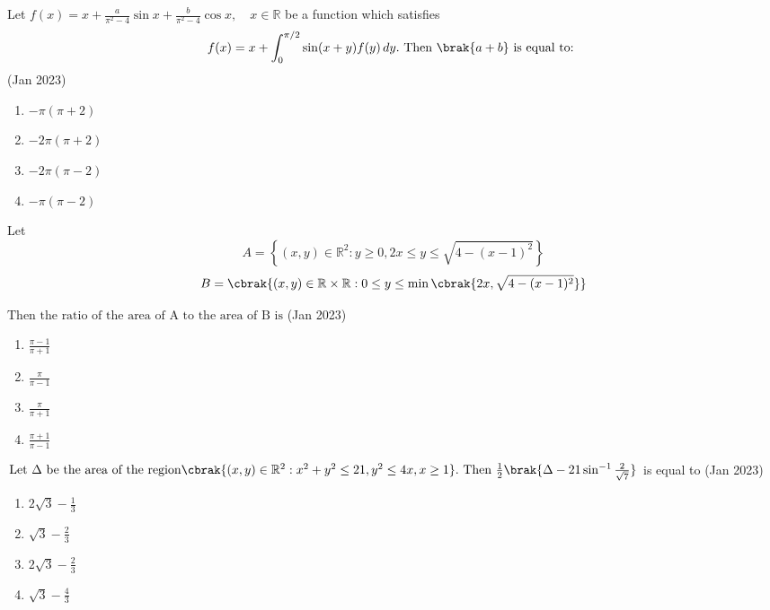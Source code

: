 \item 
Let 
$ f(x) = x + \frac{a}{\pi^2 - 4} \sin x + \frac{b}{\pi^2 - 4} \cos x, \quad x \in \mathbb{R} $ 
be a function which satisfies 
\begin{align*} 
f(x) = x + \int_0^{\pi/2} \sin(x + y) f(y) \, dy.  
\text{ Then }  \brak{a + b} \text{ is equal to: }
\end{align*}\hfill(Jan 2023)
\begin{multicols}{4}
\begin{enumerate}
   \item $-\pi(\pi + 2) $
   \item $-2\pi(\pi + 2) $
   \item $-2\pi(\pi - 2) $
   \item $-\pi(\pi - 2) $
\end{enumerate}
\end{multicols}
\item Let \quad $$A = \left\{ (x, y) \in \mathbb{R}^2: y \geq 0, 2x \leq y \leq \sqrt{4 - (x-1)^2} \right\}$$ $$B = \cbrak{ (x, y) \in \mathbb{R} \times \mathbb{R}: 0 \leq y \leq \min \cbrak{ 2x, \sqrt{4 - (x-1)^2} }}$$

$\text{Then the ratio of the area of A to the area of B is}$
\hfill(Jan 2023)
\begin{multicols}{2}
   \begin{enumerate}
       \item $ \frac{\pi - 1}{\pi + 1}$\\
     \item $ \frac{\pi}{\pi - 1}$
    \item $ \frac{\pi}{\pi + 1}$\\
     \item $ \frac{\pi + 1}{\pi - 1}$
   \end{enumerate}
\end{multicols}

\item $\text{Let } \Delta \text{ be the area of the region}
\cbrak{ (x, y) \in \mathbb{R}^2: x^2 + y^2 \leq 21, y^2 \leq 4x, x \geq 1}. \text{ Then } \frac{1}{2} \brak{\Delta - 21 \sin^{-1} \frac{2}{\sqrt{7}}}$ is equal to \hfill(Jan 2023)
\begin{multicols}{2}
\begin{enumerate}
    \item $2\sqrt{3} - \frac{1}{3}$\\
    \item $\sqrt{3} - \frac{2}{3}$
    \item $2\sqrt{3} - \frac{2}{3}$\\
    \item $\sqrt{3} - \frac{4}{3}$
\end{enumerate}
\end{multicols}

